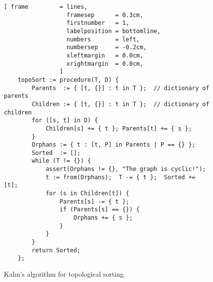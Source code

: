 \begin{figure}[!ht]
\centering
\begin{Verbatim}[ frame         = lines, 
                  framesep      = 0.3cm, 
                  firstnumber   = 1,
                  labelposition = bottomline,
                  numbers       = left,
                  numbersep     = -0.2cm,
                  xleftmargin   = 0.0cm,
                  xrightmargin  = 0.0cm,
                ]
    topoSort := procedure(T, D) {
        Parents  := { [t, {}] : t in T };  // dictionary of parents
        Children := { [t, {}] : t in T };  // dictionary of children
        for ([s, t] in D) {
            Children[s] += { t }; Parents[t] += { s };
        }
        Orphans := { t : [t, P] in Parents | P == {} };
        Sorted  := [];
        while (T != {}) {
            assert(Orphans != {}, "The graph is cyclic!");
            t := from(Orphans);  T -= { t };  Sorted += [t];
            for (s in Children[t]) {
                Parents[s] -= { t };
                if (Parents[s] == {}) {
                    Orphans += { s };
                }
            }
        }
        return Sorted;
    };
\end{Verbatim}
\vspace*{-0.3cm}
\caption{Kahn's algorithm for topological sorting.}
\label{fig:topologocal-sorting.stlx}
\end{figure}

